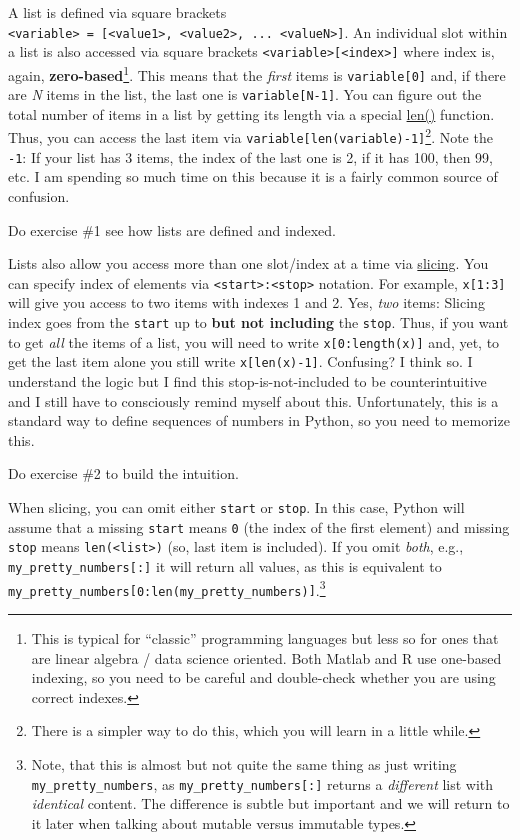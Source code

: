 \documentclass[
]{book}
\begin{document}
A list is defined via square brackets \texttt{\textless{}variable\textgreater{}\ =\ {[}\textless{}value1\textgreater{},\ \textless{}value2\textgreater{},\ ...\ \textless{}valueN\textgreater{}{]}}. An individual slot within a list is also accessed via square brackets \texttt{\textless{}variable\textgreater{}{[}\textless{}index\textgreater{}{]}} where index is, again, \textbf{zero-based}\footnote{This is typical for ``classic'' programming languages but less so for ones that are linear algebra / data science oriented. Both Matlab and R use one-based indexing, so you need to be careful and double-check whether you are using correct indexes.}. This means that the \emph{first} items is \texttt{variable{[}0{]}} and, if there are \emph{N} items in the list, the last one is \texttt{variable{[}N-1{]}}. You can figure out the total number of items in a list by getting its length via a special \href{https://docs.python.org/3/library/functions.html\#len}{len()} function. Thus, you can access the last item via \texttt{variable{[}len(variable)-1{]}}\footnote{There is a simpler way to do this, which you will learn in a little while.}. Note the \texttt{-1}: If your list has 3 items, the index of the last one is 2, if it has 100, then 99, etc. I am spending so much time on this because it is a fairly common source of confusion.

Do exercise \#1 see how lists are defined and indexed.

Lists also allow you access more than one slot/index at a time via \href{https://docs.python.org/3/library/functions.html\#slice}{slicing}. You can specify index of elements via \texttt{\textless{}start\textgreater{}:\textless{}stop\textgreater{}} notation. For example, \texttt{x{[}1:3{]}} will give you access to two items with indexes 1 and 2. Yes, \emph{two} items: Slicing index goes from the \texttt{start} up to \textbf{but not including} the \texttt{stop}. Thus, if you want to get \emph{all} the items of a list, you will need to write \texttt{x{[}0:length(x){]}} and, yet, to get the last item alone you still write \texttt{x{[}len(x)-1{]}}. Confusing? I think so. I understand the logic but I find this stop-is-not-included to be counterintuitive and I still have to consciously remind myself about this. Unfortunately, this is a standard way to define sequences of numbers in Python, so you need to memorize this.

Do exercise \#2 to build the intuition.

When slicing, you can omit either \texttt{start} or \texttt{stop}. In this case, Python will assume that a missing \texttt{start} means \texttt{0} (the index of the first element) and missing \texttt{stop} means \texttt{len(\textless{}list\textgreater{})} (so, last item is included). If you omit \emph{both}, e.g., \texttt{my\_pretty\_numbers{[}:{]}} it will return all values, as this is equivalent to \texttt{my\_pretty\_numbers{[}0:len(my\_pretty\_numbers){]}}.\footnote{Note, that this is almost but not quite the same thing as just writing \texttt{my\_pretty\_numbers}, as \texttt{my\_pretty\_numbers{[}:{]}} returns a \emph{different} list with \emph{identical} content. The difference is subtle but important and we will return to it later when talking about mutable versus immutable types.}
\end{document}
